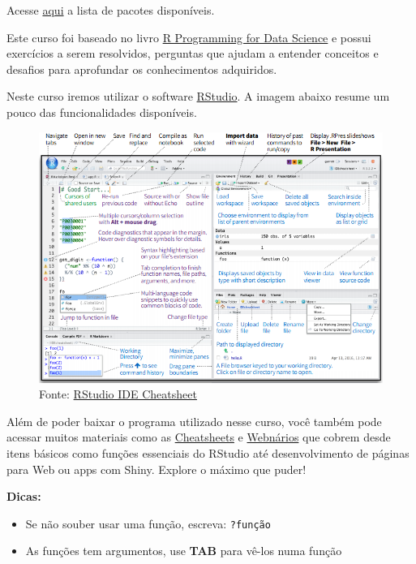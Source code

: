 \documentclass[]{book}
\providecommand{\tightlist}{%
  \setlength{\itemsep}{0pt}\setlength{\parskip}{0pt}}
\theoremstyle{definition}
\theoremstyle{definition}
\theoremstyle{definition}
\theoremstyle{remark}
\begin{document}
Acesse
\href{https://cran.r-project.org/web/packages/available_packages_by_name.html}{aqui}
a lista de pacotes disponíveis.

Este curso foi baseado no livro
\href{https://leanpub.com/rprogramming}{R Programming for Data Science}
e possui {exercícios} a serem resolvidos, {perguntas} que ajudam a
entender conceitos e {desafios} para aprofundar os conhecimentos
adquiridos.

Neste curso iremos utilizar o software
\href{https://www.rstudio.com/}{RStudio}. A imagem abaixo resume um
pouco das funcionalidades disponíveis.

\begin{figure}
\centering
\includegraphics{figuras/rstudio_ide.png}
\caption{Fonte:
\href{https://github.com/rstudio/cheatsheets/raw/master/rstudio-ide.pdf}{RStudio
IDE Cheatsheet}}
\end{figure}

Além de poder baixar o programa utilizado nesse curso, você também pode
acessar muitos materiais como as
\href{https://www.rstudio.com/resources/cheatsheets/}{Cheatsheets} e
\href{https://www.rstudio.com/resources/webinars/}{Webnários} que cobrem
desde itens básicos como funções essenciais do RStudio até
desenvolvimento de páginas para Web ou apps com Shiny. Explore o máximo
que puder!

\textbf{Dicas:}

\begin{itemize}
\tightlist
\item
  Se não souber usar uma função, escreva: \texttt{?função}
\item
  As funções tem argumentos, use \textbf{TAB} para vê-los numa função
\end{itemize}
\end{document}
